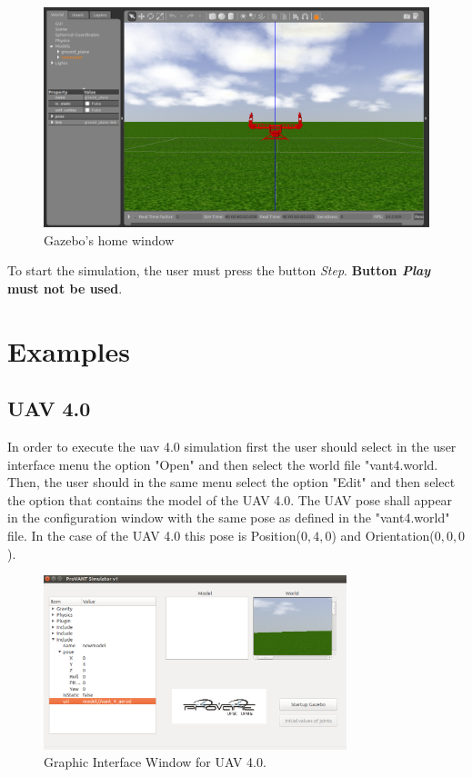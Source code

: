 \begin{figure}[!ht]
	\centering
	\includegraphics[width=400pt]{figuras/12.png}
	\caption{Gazebo's home window}
	\label{12}
\end{figure}

To start the simulation, the user must press the button \textit{Step}. \textbf{Button \textit{Play} must not be used}.




\section{Examples}


\subsection{UAV 4.0}

In order to execute the uav 4.0 simulation first the user should select in the user interface menu the option "Open" and then select the world file "vant4.world. Then, the user should in the same menu select the option "Edit" and then select the option that contains the model of the UAV 4.0. The UAV pose shall appear in the configuration window with the same pose as defined in the "vant4.world" file. In the case of the UAV 4.0 this pose is Position($0,4,0$) and Orientation($0,0,0$).



\begin{figure}[!ht]
	\centering
	\includegraphics[width=250pt]{figuras/v4gui.png}
	\caption{Graphic Interface Window for UAV 4.0.}
	\label{v4gui}
\end{figure}

